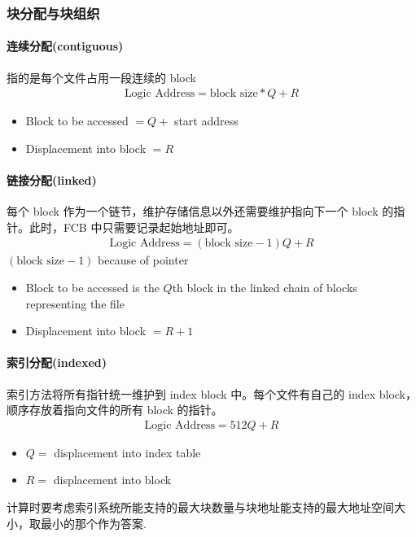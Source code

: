 \subsubsection{块分配与块组织}

\paragraph{连续分配(contiguous)}指的是每个文件占用一段连续的 block
\begin{align*}
    \text{Logic Address}=\text{block size}*Q+R
\end{align*}
\begin{itemize}
    \item Block to be accessed $=Q+$ start address
    \item Displacement into block $=R$
\end{itemize}

\paragraph{链接分配(linked)}每个 block 作为一个链节，维护存储信息以外还需要维护指向下一个 block 的指针。此时，FCB 中只需要记录起始地址即可。
\begin{align*}
    \text{Logic Address}=(\text{block size}-1)Q+R
\end{align*}
$(\text{block size}-1)$ because of pointer
\begin{itemize}
    \item Block to be accessed is the $Q$th block in the linked chain of
    blocks representing the file
    \item Displacement into block $=R+1$
\end{itemize}


\paragraph{索引分配(indexed)}索引方法将所有指针统一维护到 index block 中。每个文件有自己的 index block，顺序存放着指向文件的所有 block 的指针。
\begin{align*}
    \text{Logic Address}=512Q+R
\end{align*}
\begin{itemize}
    \item $Q =$ displacement into index table
    \item $R =$ displacement into block
\end{itemize}
计算时要考虑索引系统所能支持的最大块数量与块地址能支持的最大地址空间大小，取最小的那个作为答案. 

